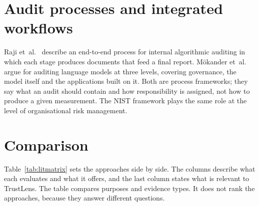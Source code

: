 \section{Audit processes and integrated workflows}
Raji et~al.\ \cite{raji2020} describe an end-to-end process for internal algorithmic auditing in which each stage produces documents that feed a final report. Mökander et~al.\ \cite{mokander2023} argue for auditing language models at three levels, covering governance, the model itself and the applications built on it. Both are process frameworks; they say what an audit should contain and how responsibility is assigned, not how to produce a given measurement. The NIST framework \cite{nist2023} plays the same role at the level of organisational risk management.

\section{Comparison}\label{sec:litposition}
Table~\ref{tab:litmatrix} sets the approaches side by side. The columns describe what each evaluates and what it offers, and the last column states what is relevant to TrustLens. The table compares purposes and evidence types. It does not rank the approaches, because they answer different questions.


